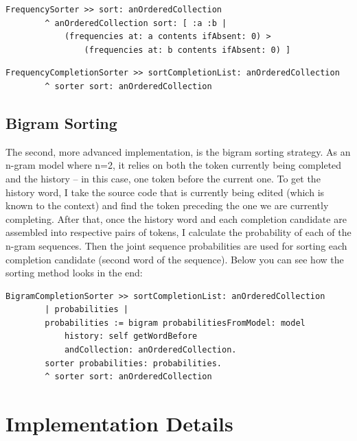 \begin{lstlisting}[caption={The sorter implementation: sorting the candidates according to their frequencies}, label={lst:unigramCode2}]
    FrequencySorter >> sort: anOrderedCollection
        ^ anOrderedCollection sort: [ :a :b |
            (frequencies at: a contents ifAbsent: 0) >
                (frequencies at: b contents ifAbsent: 0) ]
\end{lstlisting}

\begin{lstlisting}[caption={The unigram sorter implementation: returning the results sorted in the code above}, label={lst:unigramCode3}]
    FrequencyCompletionSorter >> sortCompletionList: anOrderedCollection
        ^ sorter sort: anOrderedCollection
\end{lstlisting}

\subsection{Bigram Sorting}
The second, more advanced implementation, is the bigram sorting strategy. As an n-gram model where n=2, it relies on both the token currently being completed and the history -- in this case, one token before the current one. To get the history word, I take the source code that is currently being edited (which is known to the context) and find the token preceding the one we are currently completing. After that, once the history word and each completion candidate are assembled into respective pairs of tokens, I calculate the probability of each of the n-gram sequences. Then the joint sequence probabilities are used for sorting each completion candidate (second word of the sequence). Below you can see how the sorting method looks in the end:

\begin{lstlisting}[caption={The bigram sorter implementation: receives the list of completions, gets the word before from context, trains the model, and sorts the completions based on sequence probabilities}, label={lst:bigramCode}]
    BigramCompletionSorter >> sortCompletionList: anOrderedCollection
        | probabilities |
        probabilities := bigram probabilitiesFromModel: model
            history: self getWordBefore
            andCollection: anOrderedCollection.
        sorter probabilities: probabilities.
        ^ sorter sort: anOrderedCollection
\end{lstlisting}

\section{Implementation Details}
\label{sec:ProposedSolution-Implementation}
